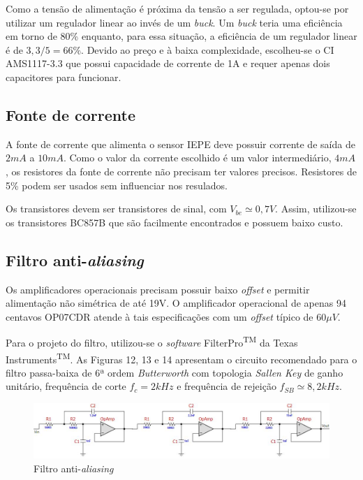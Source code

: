 \documentclass[
	12pt,				%
	openright,			%
	twoside,			%
	a4paper,			%
	english,			%
	french,				%
	spanish,			%
	brazil,				%
	]{abntex2}
\begin{document}
			Como a tensão de alimentação é próxima da tensão a ser regulada,
			optou-se por utilizar um regulador linear ao invés de um
			\textit{buck}. Um \textit{buck} teria uma eficiência em torno de
			80\% enquanto, para essa situação, a eficiência de um regulador
			linear é de $3,3/5 = 66\%$. Devido ao preço e à baixa
			complexidade, escolheu-se o CI AMS1117-3.3 que possui capacidade
			de corrente de 1A e requer apenas dois capacitores para
			funcionar.

		\subsection{Fonte de corrente}
			A fonte de corrente que alimenta o sensor IEPE deve possuir
			corrente de saída de $2mA$ a $10mA$. Como o valor da corrente
			escolhido é um valor intermediário, $4mA$, os resistores da
			fonte de corrente não precisam ter valores precisos. Resistores
			de 5\% podem ser usados sem influenciar nos resulados.

			Os transistores devem ser transistores de sinal, com
			$V_{be}\simeq 0,7V$. Assim, utilizou-se os transistores BC857B
			que são facilmente encontrados e possuem baixo custo. 

		\subsection{Filtro anti-\textit{aliasing}}
			Os amplificadores operacionais precisam possuir baixo
			\textit{offset} e permitir alimentação não simétrica de até 19V.
			O amplificador operacional de apenas 94 centavos OP07CDR atende
			à tais especificações com um \textit{offset} típico de $60\mu
			V$.

			Para o projeto do filtro, utilizou-se o \textit{software}
			FilterPro\textsuperscript{TM} da Texas
			Instruments\textsuperscript{TM}. As Figuras 12, 13 e 14 apresentam o
			circuito recomendado para o filtro passa-baixa de 6ª ordem
			\textit{Butterworth} com topologia \textit{Sallen Key} de ganho
			unitário, frequência de corte $f_c = 2kHz$ e frequência de
			rejeição $f_{SB}\simeq 8,2kHz$.

			\begin{figure}[!ht]
				\centering
				\includegraphics[width=\linewidth]{../Fotos/filterPro.jpg}
				\caption{Filtro anti-\textit{aliasing}}
			\end{figure}
\end{document}
